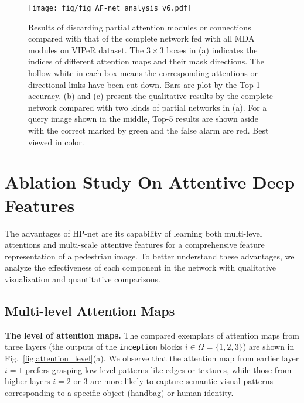\documentclass[10pt,twocolumn,letterpaper]{article}
\begin{document}
\begin{figure*}[t]
\centering
\texttt{[image: fig/fig\_AF-net\_analysis\_v6.pdf]}
\caption{Results of discarding partial attention modules or connections compared with that of the complete network fed with all MDA modules on VIPeR dataset. The $3\times 3$ boxes in (a) indicates the indices of different attention maps and their mask directions. The hollow white in each box means the corresponding attentions or directional links have been cut down. Bars are plot by the Top-1 accuracy. (b) and (c) present the qualitative results by the complete network compared with two kinds of partial networks in (a). For a query image shown in the middle, Top-5 results are shown aside with the correct marked by green and the false alarm are red. Best viewed in color.
}
\label{fig:AF-net_analysis}
\end{figure*}



\section{Ablation Study On Attentive Deep Features}
\label{sec:ablation_study}

The advantages of HP-net are its capability of learning both multi-level attentions and multi-scale attentive features for a comprehensive feature representation of a pedestrian image.
%
To better understand these advantages, we analyze the effectiveness of each component in the network with qualitative visualization and quantitative comparisons.

\subsection{Multi-level Attention Maps}
\label{subsec:multi_level_attention_maps}

\noindent\textbf{The level of attention maps.}
%
The compared exemplars of attention maps from three layers (\ie the outputs of the \texttt{inception} blocks $i\in\Omega=\{1,2,3\}$) are shown in Fig.~\ref{fig:attention_level}(a).
%
We observe that the attention map from earlier layer $i=1$ prefers grasping low-level patterns like edges or textures, while those from higher layers $i=2$ or $3$ are more likely to capture semantic visual patterns corresponding to a specific object (\eg handbag) or human identity.
\end{document}
